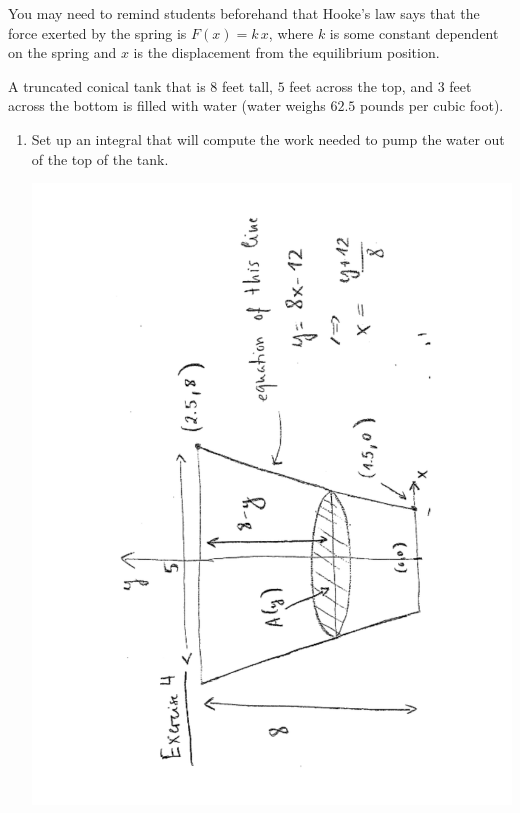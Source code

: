 \documentclass[noinstructornotes]{ximera}
\begin{document}
\begin{problem}
\begin{enumerate}
	\end{enumerate}
		
\end{problem}

\begin{instructorNotes}
You may need to remind students beforehand that Hooke's law says that the force exerted by the spring is $F(x)=k \, x$, where $k$ is some constant dependent on the spring and $x$ is the displacement from the equilibrium position.
\end{instructorNotes}










\begin{problem}
A truncated conical tank that is $8$ feet tall, $5$ feet across the top, and $3$ feet across the bottom is filled with water (water weighs $62.5$ pounds per cubic foot).  
\begin{enumerate}
		\item  Set up an integral that will compute the work needed to pump the water out of the top of the tank.  
		\begin{freeResponse}
			\begin{image}
			\includegraphics[trim= 120 320 100 180, angle=-89.99, scale=0.6]{Figure6-7-1.pdf}
			\end{image}
		

\end{freeResponse}
\end{enumerate}
\end{problem}
\end{document}
